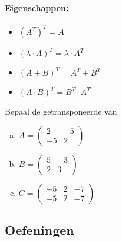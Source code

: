\documentclass[12pt,twoside]{article}
\begin{document}
\paragraph*{Eigenschappen:}
\begin{itemize}
\item $(A^T)^T=A$
\item $(\lambda \cdot A)^T=\lambda \cdot A^T$
\item $(A + B)^T = A^T + B^T$
\item $(A \cdot B)^T = B^T \cdot A^T$
\end{itemize}

\begin{oefening}
  Bepaal de getransponeerde van
  \begin{multicols}{3}
    \begin{enumerate}[(a)]
    \item $A=
      \begin{pmatrix}
        2 & -5\\
        -5 & 2
      \end{pmatrix}
      $
    \item $B=
      \begin{pmatrix}
        5 & -3\\
        2 & 3
      \end{pmatrix}
      $
    \item $C=
      \begin{pmatrix}
        -5 & 2 & -7\\
        -5 & 2 & -7
      \end{pmatrix}
      $
    \end{enumerate}
  \end{multicols}
\end{oefening}

\needspace{3cm}
\subsection{Oefeningen}
\end{document}

